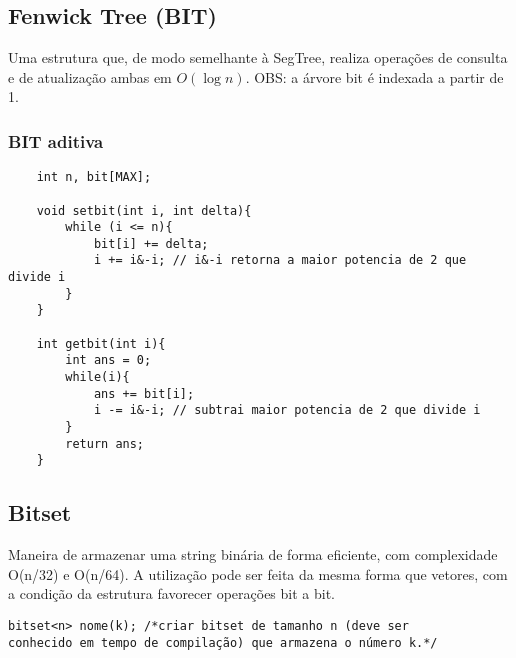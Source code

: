 \subsection{Fenwick Tree (BIT)}

\par Uma estrutura que, de modo semelhante à SegTree, realiza operações de consulta e de atualização ambas em $O(\log n)$. OBS: a árvore bit é indexada a partir de 1.

\subsubsection{BIT aditiva}

\begin{verbatim}
    int n, bit[MAX];

    void setbit(int i, int delta){
        while (i <= n){
            bit[i] += delta;
            i += i&-i; // i&-i retorna a maior potencia de 2 que divide i
        }
    }

    int getbit(int i){
        int ans = 0;
        while(i){
            ans += bit[i];
            i -= i&-i; // subtrai maior potencia de 2 que divide i
        }
        return ans;
    }
\end{verbatim}

\subsection{Bitset}
    Maneira de armazenar uma string binária de forma eficiente, com complexidade O(n/32) e O(n/64). A utilização pode ser feita da mesma forma que vetores, com a condição da estrutura favorecer operações bit a bit.
\begin{verbatim}
bitset<n> nome(k); /*criar bitset de tamanho n (deve ser 
conhecido em tempo de compilação) que armazena o número k.*/
\end{verbatim}
    
\pagebreak

